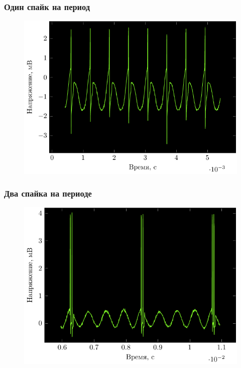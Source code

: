 \begin{frame}%
	\frametitle{Один спайк на период}
	\begin{figure}[h]
		\hspace{-2em}
		\includegraphics[]{img/onespike}
	\end{figure}
\end{frame}
\begin{frame}%
	\frametitle{Два спайка на периоде}
	\begin{figure}[h]
		\hspace{-2em}
		\includegraphics[]{img/twospike}
	\end{figure}
\end{frame}
